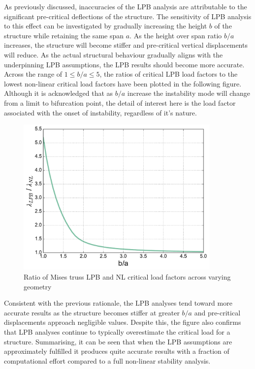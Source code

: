 As previously discussed, inaccuracies of the LPB analysis are attributable to the significant pre-critical deflections of the structure. The sensitivity of LPB analysis to this effect can be investigated by gradually increasing the height $b$ of the structure while retaining the same span $a$. As the height over span ratio $b/a$ increases, the structure will become stiffer and pre-critical vertical displacements will reduce. As the actual structural behaviour gradually aligns with the underpinning LPB assumptions, the LPB results should become more accurate. Across the range of $1 \le b/a \le 5$, the ratios of critical LPB load factors to the lowest non-linear critical load factors have been plotted in the following figure. Although it is acknowledged that as $b/a$ increase the instability mode will change from a limit to bifurcation point, the detail of interest here is the load factor associated with the onset of instability, regardless of it's nature.

\begin{figure}[H]
	\centering
	\def\svgwidth{\columnwidth}
	\includegraphics[width=10cm]{images/stability_analysis_mises_truss_lpb.pdf}
	\caption{Ratio of Mises truss LPB and NL critical load factors across varying geometry}
	\label{stab3}
\end{figure}

Consistent with the previous rationale, the LPB analyses tend toward more accurate results as the structure becomes stiffer at greater $b/a$ and pre-critical displacements approach negligible values. Despite this, the figure also confirms that LPB analyses continue to typically overestimate the critical load for a structure. Summarising, it can be seen that when the LPB assumptions are approximately fulfilled it produces quite accurate results with a fraction of computational effort compared to a full non-linear stability analysis.

